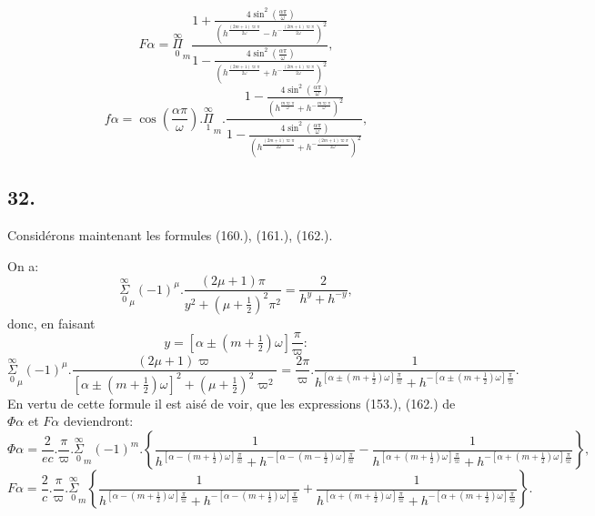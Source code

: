 \documentclass{article}
\begin{document}
\[
F\alpha = \overset{\infty}{\underset{0}{\Pi}}_{m}\frac{1+\frac{4\sin^{2}\left(\frac{\alpha\pi}{\omega}\right)}{\left(h^{\frac{(2m+1)\varpi\pi}{2\omega}}-h^{-\frac{(2m+1)\varpi\pi}{2\omega}}\right)^{2}}}{1-\frac{4\sin^{2}\left(\frac{\alpha\pi}{\omega}\right)}{\left(h^{\frac{(2m+1)\varpi\pi}{2\omega}}+h^{-\frac{(2m+1)\varpi\pi}{2\omega}}\right)^{2}}},
\tag{188.}
\]
\[
f\alpha = \cos\left(\frac{\alpha\pi}{\omega}\right).\overset{\infty}{\underset{1}{\Pi}}_{m}.\frac{1-\frac{4\sin^{2}\left(\frac{\alpha\pi}{\omega}\right)}{\left(h^{\frac{m\varpi\pi}{\omega}}+h^{-\frac{m\varpi\pi}{\omega}}\right)^{2}}}{1-\frac{4\sin^{2}\left(\frac{\alpha\pi}{\omega}\right)}{\left(h^{\frac{(2m+1)\varpi\pi}{2\omega}}+h^{-\frac{(2m+1)\varpi\pi}{2\omega}}\right)^{2}}},
\tag{189.}
\]

\subsection*{32.}

Considérons maintenant les formules (160.), (161.), (162.).

On a:
\[
\overset{\infty}{\underset{0}{\Sigma}}_{\mu}(-1)^{\mu}.\frac{(2\mu+1)\pi}{y^{2}+(\mu+\tfrac{1}{2})^{2}\pi^{2}} = \frac{2}{h^{y}+h^{-y}},
\]
donc, en faisant
\[
y = [\alpha\pm(m+\tfrac{1}{2})\omega]\frac{\pi}{\varpi}:
\]
\[
\overset{\infty}{\underset{0}{\Sigma}}_{\mu}(-1)^{\mu}.\frac{(2\mu+1)\varpi}{[\alpha\pm(m+\tfrac{1}{2})\omega]^{2}+(\mu+\tfrac{1}{2})^{2}\varpi^{2}} = \frac{2\pi}{\varpi}.\frac{1}{h^{[\alpha\pm(m+\frac{1}{2})\omega]\frac{\pi}{\varpi}}+h^{-[\alpha\pm(m+\frac{1}{2})\omega]\frac{\pi}{\varpi}}}.
\]
En vertu de cette formule il est aisé de voir, que les expressions (153.), (162.) de $\Phi\alpha$ et $F\alpha$ deviendront:
\[
\Phi\alpha = \frac{2}{ec}.\frac{\pi}{\varpi}.\overset{\infty}{\underset{0}{\Sigma}}_{m}(-1)^{m}.\left\{\frac{1}{h^{[\alpha-(m+\frac{1}{2})\omega]\frac{\pi}{\varpi}}+h^{-[\alpha-(m-\frac{1}{2})\omega]\frac{\pi}{\varpi}}}-\frac{1}{h^{[\alpha+(m+\frac{1}{2})\omega]\frac{\pi}{\varpi}}+h^{-[\alpha+(m+\frac{1}{2})\omega]\frac{\pi}{\varpi}}}\right\},
\tag{190.}
\]
\[
F\alpha = \frac{2}{c}.\frac{\pi}{\varpi}.\overset{\infty}{\underset{0}{\Sigma}}_{m}\left\{\frac{1}{h^{[\alpha-(m+\frac{1}{2})\omega]\frac{\pi}{\varpi}}+h^{-[\alpha-(m+\frac{1}{2})\omega]\frac{\pi}{\varpi}}}+\frac{1}{h^{[\alpha+(m+\frac{1}{2})\omega]\frac{\pi}{\varpi}}+h^{-[\alpha+(m+\frac{1}{2})\omega]\frac{\pi}{\varpi}}}\right\}.
\tag{191.}
\]
\end{document}
